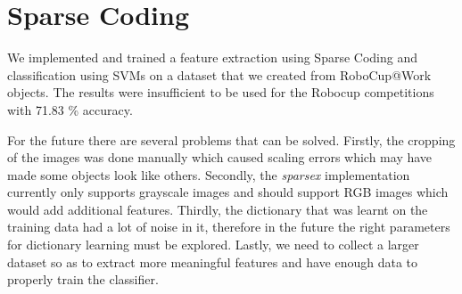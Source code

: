 \documentclass[	DIV=calc,%
				paper=a4,%
				fontsize=11pt,%
				twocolumn]{scrartcl}	 %
\begin{document}
\section*{Sparse Coding}
We implemented and trained a feature extraction using Sparse Coding and classification using SVMs on a dataset that we created from RoboCup@Work objects. The results were insufficient to be used for the Robocup competitions with 71.83 \% accuracy.

For the future there are several problems that can be solved. Firstly, the cropping of the images was done manually which caused scaling errors which may have made some objects look like others. Secondly, the \textit{sparsex} implementation currently only supports grayscale images and should support RGB images which would add additional features. Thirdly, the dictionary that was learnt on the training data had a lot of noise in it, therefore in the future the right parameters for dictionary learning must be explored. Lastly, we need to collect a larger dataset so as to extract more meaningful features and have enough data to properly train the classifier.

 


\newpage
\end{document}
